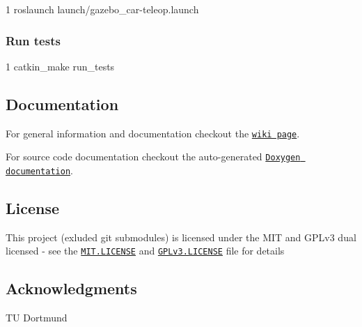 \begin{DoxyCode}
1 roslaunch launch/gazebo\_car-teleop.launch
\end{DoxyCode}


\subsubsection*{Run tests}


\begin{DoxyCode}
1 catkin\_make run\_tests
\end{DoxyCode}


\subsection*{Documentation}


\begin{DoxyItemize}
\item For general information and documentation checkout the \href{https://github.com/Autonomous-Racing-PG/ros.package/wiki}{\tt wiki page}.
\item For source code documentation checkout the auto-\/generated \href{https://autonomous-racing-pg.github.io/ros.package/html/index.html}{\tt Doxygen documentation}.
\end{DoxyItemize}

\subsection*{License}

This project (exluded git submodules) is licensed under the M\+IT and G\+P\+Lv3 dual licensed -\/ see the \href{MIT.LICENSE}{\tt M\+I\+T.\+L\+I\+C\+E\+N\+SE} and \href{GPLv3.LICENSE}{\tt G\+P\+Lv3.\+L\+I\+C\+E\+N\+SE} file for details

\subsection*{Acknowledgments}


\begin{DoxyItemize}
\item TU Dortmund 
\end{DoxyItemize}